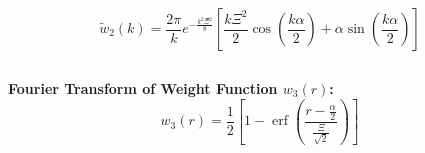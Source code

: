 \documentclass[letterpaper,twocolumn,amsmath,amssymb,prb]{revtex4-1}
\begin{document}
\begin{widetext}
\begin{equation}{\widetilde{w}_2(k)=\frac{2\pi}{k}e^{-\frac{k^2\Xi^2}{8}}\left[\frac{k\Xi^2}{2}\cos\left(\frac{k\alpha}{2}\right)+\alpha\sin\left(\frac{k\alpha}{2}\right)\right]}\end{equation}

\[{}\]

\noindent\textbf{Fourier Transform of Weight Function $w_3(r)$:}
\begin{equation}
    w_3(r)=\frac{1}{2}\left[1-\operatorname{erf}\left(\frac{r-\frac{\alpha}{2}}{\frac{\Xi}{\sqrt{2}}}\right)\right]
\end{equation}


\end{widetext}
\end{document}
